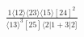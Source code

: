 \documentclass[varwidth, border=5pt]{standalone}
\begin{document}
\begin{my}
$\begin{gathered}
\scriptscriptstyle\frac{1⟨12⟩⟨23⟩⟨15⟩[24]^2}{⟨13⟩^3[25]⟨2|1+3|2]}
\end{gathered}$
\end{my}
\end{document}
